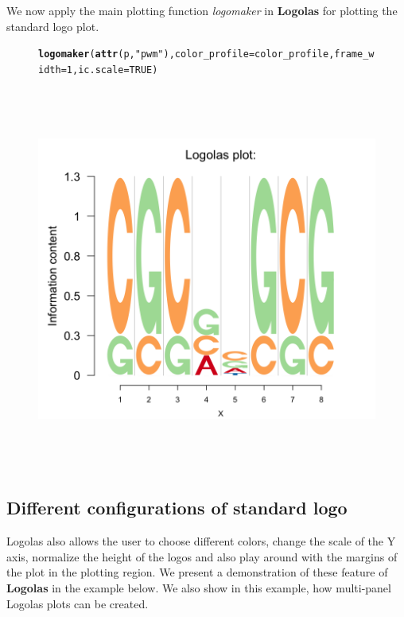 \documentclass[12pt]{article}\usepackage[]{graphicx}\usepackage[usenames,dvipsnames]{color}
\makeatletter
\newcommand{\hlnum}[1]{\textcolor[rgb]{0.686,0.059,0.569}{#1}}%
\newcommand{\hlstr}[1]{\textcolor[rgb]{0.192,0.494,0.8}{#1}}%
\newcommand{\hlstd}[1]{\textcolor[rgb]{0.345,0.345,0.345}{#1}}%
\newcommand{\hlkwc}[1]{\textcolor[rgb]{0.333,0.667,0.333}{#1}}%
\newcommand{\hlkwd}[1]{\textcolor[rgb]{0.737,0.353,0.396}{\textbf{#1}}}%
\newenvironment{kframe}{%
 \def\at@end@of@kframe{}%
 \ifinner\ifhmode%
  \def\at@end@of@kframe{\end{minipage}}%
  \begin{minipage}{\columnwidth}%
 \fi\fi%
 \def\FrameCommand##1{\hskip\@totalleftmargin \hskip-\fboxsep
 \colorbox{shadecolor}{##1}\hskip-\fboxsep
     \hskip-\linewidth \hskip-\@totalleftmargin \hskip\columnwidth}%
 \MakeFramed {\advance\hsize-\width
   \@totalleftmargin\z@ \linewidth\hsize
   \@setminipage}}%
 {\par\unskip\endMakeFramed%
 \at@end@of@kframe}
\newenvironment{knitrout}{}{} %
\makeatother
\begin{document}
We now apply the main plotting function \textit{logomaker} in \textbf{Logolas} for plotting the standard logo plot.

\begin{figure}[h]
\begin{center}
\begin{knitrout}
\color{fgcolor}\begin{kframe}
\begin{alltt}
\hlkwd{logomaker}\hlstd{(}\hlkwd{attr}\hlstd{(p,} \hlstr{"pwm"}\hlstd{),}\hlkwc{color_profile} \hlstd{= color_profile,} \hlkwc{frame_width} \hlstd{=} \hlnum{1}\hlstd{,}\hlkwc{ic.scale} \hlstd{=} \hlnum{TRUE}\hlstd{)}
\end{alltt}
\end{kframe}
\includegraphics[width=6in,height=5in]{figure/standard_logo-1} 

\end{knitrout}
\end{center}
\end{figure}


\subsection{Different configurations of standard logo}

Logolas also allows the user to choose different colors, change the scale of the Y axis, normalize the height of the logos and also play around with the margins of the plot in the plotting region. We present a demonstration of these feature of \textbf{Logolas} in the example below. We also show in this example, how multi-panel Logolas plots can be created.
\end{document}

